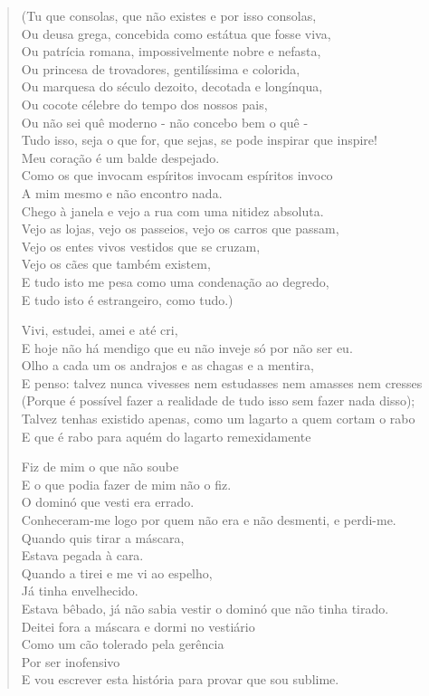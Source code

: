 \documentclass[10pt,a5paper,oneside]{book}
\begin{document}
\begin{verse}
(Tu que consolas, que não existes e por isso consolas,\\
Ou deusa grega, concebida como estátua que fosse viva,\\
Ou patrícia romana, impossivelmente nobre e nefasta,\\
Ou princesa de trovadores, gentilíssima e colorida,\\
Ou marquesa do século dezoito, decotada e longínqua,\\
Ou cocote célebre do tempo dos nossos pais,\\
Ou não sei quê moderno - não concebo bem o quê -\\
Tudo isso, seja o que for, que sejas, se pode inspirar que inspire!\\
Meu coração é um balde despejado.\\
Como os que invocam espíritos invocam espíritos invoco\\
A mim mesmo e não encontro nada.\\
Chego à janela e vejo a rua com uma nitidez absoluta.\\
Vejo as lojas, vejo os passeios, vejo os carros que passam,\\
Vejo os entes vivos vestidos que se cruzam,\\
Vejo os cães que também existem,\\
E tudo isto me pesa como uma condenação ao degredo,\\
E tudo isto é estrangeiro, como tudo.)

Vivi, estudei, amei e até cri,\\
E hoje não há mendigo que eu não inveje só por não ser eu.\\
Olho a cada um os andrajos e as chagas e a mentira,\\
E penso: talvez nunca vivesses nem estudasses nem amasses nem cresses\\
(Porque é possível fazer a realidade de tudo isso sem fazer nada disso);\\
Talvez tenhas existido apenas, como um lagarto a quem cortam o rabo\\
E que é rabo para aquém do lagarto remexidamente

Fiz de mim o que não soube\\
E o que podia fazer de mim não o fiz.\\
O dominó que vesti era errado.\\
Conheceram-me logo por quem não era e não desmenti, e perdi-me.\\
Quando quis tirar a máscara,\\
Estava pegada à cara.\\
Quando a tirei e me vi ao espelho,\\
Já tinha envelhecido.\\
Estava bêbado, já não sabia vestir o dominó que não tinha tirado.\\
Deitei fora a máscara e dormi no vestiário\\
Como um cão tolerado pela gerência\\
Por ser inofensivo\\
E vou escrever esta história para provar que sou sublime.


\end{verse}
\end{document}

